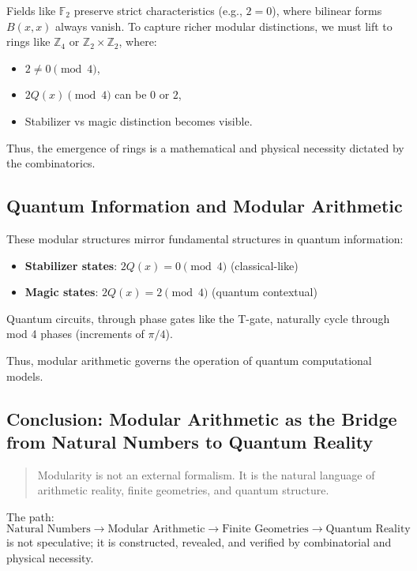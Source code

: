 \documentclass[11pt]{article}
\begin{document}
Fields like $\mathbb{F}_2$ preserve strict characteristics (e.g., $2=0$), where bilinear forms $B(x,x)$ always vanish. To capture richer modular distinctions, we must lift to rings like $\mathbb{Z}_4$ or $\mathbb{Z}_2 \times \mathbb{Z}_2$, where:
\begin{itemize}
    \item $2 \neq 0 \pmod{4}$,
    \item $2Q(x) \pmod{4}$ can be $0$ or $2$,
    \item Stabilizer vs magic distinction becomes visible.
\end{itemize}
Thus, the emergence of rings is a mathematical and physical necessity dictated by the combinatorics.

\subsection{Quantum Information and Modular Arithmetic}

These modular structures mirror fundamental structures in quantum information:
\begin{itemize}
    \item \textbf{Stabilizer states}: $2Q(x) = 0 \pmod{4}$ (classical-like)
    \item \textbf{Magic states}: $2Q(x) = 2 \pmod{4}$ (quantum contextual)
\end{itemize}

Quantum circuits, through phase gates like the T-gate, naturally cycle through mod 4 phases (increments of $\pi/4$).

Thus, modular arithmetic governs the operation of quantum computational models.

\subsection{Conclusion: Modular Arithmetic as the Bridge from Natural Numbers to Quantum Reality}

\begin{quote}
Modularity is not an external formalism. It is the natural language of arithmetic reality, finite geometries, and quantum structure.
\end{quote}

The path:
\[
\boxed{\text{Natural Numbers}} \longrightarrow \boxed{\text{Modular Arithmetic}} \longrightarrow \boxed{\text{Finite Geometries}} \longrightarrow \boxed{\text{Quantum Reality}}
\]
is not speculative; it is constructed, revealed, and verified by combinatorial and physical necessity.
\end{document}
